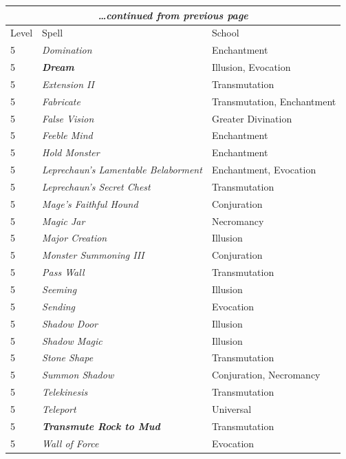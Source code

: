 \begin{multicols}{2}
\noindent
\begin{tabular}{|p{}|p{}|p{}|}
\multicolumn{3}{c}{\textit{\ldots continued from previous page}} \\
\hline
Level	& Spell	& School \\
\hline\hline
\rowcolor[gray]{.9}5	& \textit{Domination}	& Enchantment \\
5	& \textbf{\textit{Dream}}	& Illusion, Evocation \\
\rowcolor[gray]{.9}5	& \textit{Extension II}	& Transmutation \\
5	& \textit{Fabricate}	& Transmutation, Enchantment \\
\rowcolor[gray]{.9}5	& \textit{False Vision}	& Greater Divination \\
5	& \textit{Feeble Mind}	& Enchantment \\
\rowcolor[gray]{.9}5	& \textit{Hold Monster}	& Enchantment \\
5	& \textit{Leprechaun's Lamentable Belaborment}	& Enchantment, Evocation \\
\rowcolor[gray]{.9}5	& \textit{Leprechaun's Secret Chest}	& Transmutation \\
5	& \textit{Mage's Faithful Hound}	& Conjuration \\
\rowcolor[gray]{.9}5	& \textit{Magic Jar}	& Necromancy \\
5	& \textit{Major Creation}	& Illusion \\
\rowcolor[gray]{.9}5	& \textit{Monster Summoning III}	& Conjuration \\
5	& \textit{Pass Wall}	& Transmutation \\
\rowcolor[gray]{.9}5	& \textit{Seeming}	& Illusion \\
5	& \textit{Sending}	& Evocation \\
\rowcolor[gray]{.9}5	& \textit{Shadow Door}	& Illusion \\
5	& \textit{Shadow Magic}	& Illusion \\
\rowcolor[gray]{.9}5	& \textit{Stone Shape}	& Transmutation \\
5	& \textit{Summon Shadow}	& Conjuration, Necromancy \\
\rowcolor[gray]{.9}5	& \textit{Telekinesis}	& Transmutation \\
5	& \textit{Teleport}	& Universal \\
\rowcolor[gray]{.9}5	& \textbf{\textit{Transmute Rock to Mud}}	& Transmutation \\
5	& \textit{Wall of Force}	& Evocation \\

\end{tabular}
\end{multicols}
